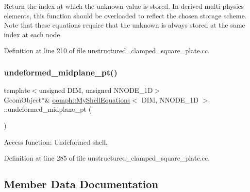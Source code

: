 Return the index at which the unknown value is stored. In derived multi-\/physics elements, this function should be overloaded to reflect the chosen storage scheme. Note that these equations require that the unknown is always stored at the same index at each node. 



Definition at line 210 of file unstructured\+\_\+clamped\+\_\+square\+\_\+plate.\+cc.

\mbox{\label{classoomph_1_1MyShellEquations_acf40f3e2413d4640be3ba3664b8d0426}} 
\subsubsection{\texorpdfstring{undeformed\+\_\+midplane\+\_\+pt()}{undeformed\_midplane\_pt()}}
{\footnotesize\ttfamily template$<$unsigned D\+IM, unsigned N\+N\+O\+D\+E\+\_\+1D$>$ \\
Geom\+Object$\ast$\& \hyperlink{classoomph_1_1MyShellEquations}{oomph\+::\+My\+Shell\+Equations}$<$ D\+IM, N\+N\+O\+D\+E\+\_\+1D $>$\+::undeformed\+\_\+midplane\+\_\+pt (\begin{DoxyParamCaption}{ }\end{DoxyParamCaption})\hspace{0.3cm}{\ttfamily [inline]}}



Access function\+: Undeformed shell. 



Definition at line 285 of file unstructured\+\_\+clamped\+\_\+square\+\_\+plate.\+cc.



\subsection{Member Data Documentation}
\mbox{\label{classoomph_1_1MyShellEquations_a6cd7175e7205dc7cea4e0e505f3cb8b9}} 
